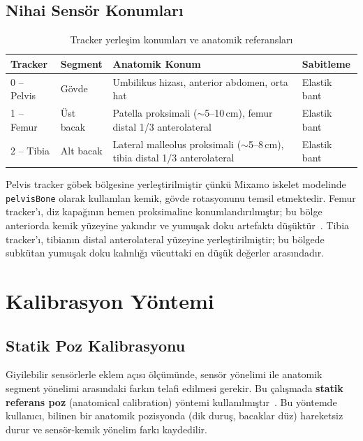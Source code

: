 \documentclass[11pt,a4paper]{article}
\begin{document}
\subsection{Nihai Sens\"or Konumlar{\i}}

\begin{table}[H]
\centering
\caption{Tracker yerle\c{s}im konumlar{\i} ve anatomik referanslar{\i}}
\label{tab:konumlar}
\renewcommand{\arraystretch}{1.25}
\begin{tabularx}{\textwidth}{llXl}
\toprule
\textbf{Tracker} & \textbf{Segment} & \textbf{Anatomik Konum} & \textbf{Sabitleme} \\
\midrule
0 -- Pelvis & G\"ovde & Umbilikus hizas{\i}, anterior abdomen, orta hat & Elastik bant \\
1 -- Femur  & \"Ust bacak & Patella proksimali ($\sim$5--10\,cm), femur distal 1/3 anterolateral & Elastik bant \\
2 -- Tibia  & Alt bacak & Lateral malleolus proksimali ($\sim$5--8\,cm), tibia distal 1/3 anterolateral & Elastik bant \\
\bottomrule
\end{tabularx}
\end{table}

Pelvis tracker g\"obek b\"olgesine yerle\c{s}tirilmi\c{s}tir \c{c}\"unk\"u Mixamo iskelet
modelinde \texttt{pelvisBone} olarak kullan{\i}lan kemik, g\"ovde
rotasyonunu temsil etmektedir. Femur tracker'{\i}, diz kapa\u{g}{\i}n{\i}n
hemen proksimaline konumland{\i}r{\i}lm{\i}\c{s}t{\i}r; bu b\"olge anteriorda kemik
y\"uzeyine yak{\i}nd{\i}r ve yumu\c{s}ak doku artefakt{\i} d\"u\c{s}\"ukt\"ur~\cite{leardini2005}.
Tibia tracker'{\i}, tibian{\i}n distal anterolateral y\"uzeyine
yerle\c{s}tirilmi\c{s}tir; bu b\"olgede subk\"utan yumu\c{s}ak doku kal{\i}nl{\i}\u{g}{\i}
v\"ucuttaki en d\"u\c{s}\"uk de\u{g}erler aras{\i}ndad{\i}r.

\section{Kalibrasyon Y\"ontemi}
\label{sec:kalibrasyon}

\subsection{Statik Poz Kalibrasyonu}

Giyilebilir sens\"orlerle eklem a\c{c}{\i}s{\i} \"ol\c{c}\"um\"unde, sens\"or y\"onelimi ile
anatomik segment y\"onelimi aras{\i}ndaki fark{\i}n telafi edilmesi
gerekir. Bu \c{c}al{\i}\c{s}mada \textbf{statik referans poz} (anatomical
calibration) y\"ontemi kullan{\i}lm{\i}\c{s}t{\i}r~\cite{favre2006,palermo2014}. Bu
y\"ontemde kullan{\i}c{\i}, bilinen bir anatomik pozisyonda (dik duru\c{s},
bacaklar d\"uz) hareketsiz durur ve sens\"or-kemik y\"onelim fark{\i}
kaydedilir.
\end{document}
